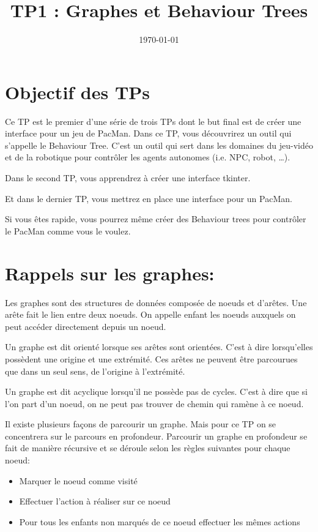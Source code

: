 \documentclass{article}
\date{\today}
\title{TP1 : Graphes et Behaviour Trees}
\begin{document}
\maketitle

\section{Objectif des TPs}
\label{sec-1}
Ce TP est le premier d'une série de trois TPs dont le but final est de créer une interface pour un jeu de PacMan.
Dans ce TP, vous découvrirez un outil qui s'appelle le Behaviour Tree.
C'est un outil qui sert dans les domaines du jeu-vidéo et de la robotique pour contrôler les agents autonomes (i.e. NPC, robot, \ldots{}).

\noindent
Dans le second TP, vous apprendrez à créer une interface tkinter.

\noindent
Et dans le dernier TP, vous mettrez en place une interface pour un PacMan.

\noindent
Si vous êtes rapide, vous pourrez même créer des Behaviour trees pour contrôler le PacMan comme vous le voulez.

\section{Rappels sur les graphes:}
\label{sec-2}
Les graphes sont des structures de données composée de noeuds et d'arêtes.
Une arête fait le lien entre deux noeuds.
On appelle enfant les noeuds auxquels on peut accéder directement depuis un noeud.

Un graphe est dit orienté lorsque ses arêtes sont orientées.
C'est à dire lorsqu'elles possèdent une origine et une extrémité.
Ces arêtes ne peuvent être parcourues que dans un seul sens, de l'origine à l'extrémité.

Un graphe est dit acyclique lorsqu'il ne possède pas de cycles.
C'est à dire que si l'on part d'un noeud, on ne peut pas trouver de chemin qui ramène à ce noeud.

Il existe plusieurs façons de parcourir un graphe. Mais pour ce TP on se concentrera sur le parcours en profondeur.
Parcourir un graphe en profondeur se fait de manière récursive et se déroule selon les règles suivantes pour chaque noeud: 
\begin{itemize}
\item Marquer le noeud comme visité
\item Effectuer l'action à réaliser sur ce noeud
\item Pour tous les enfants non marqués de ce noeud effectuer les mêmes actions
\end{itemize}
\end{document}

